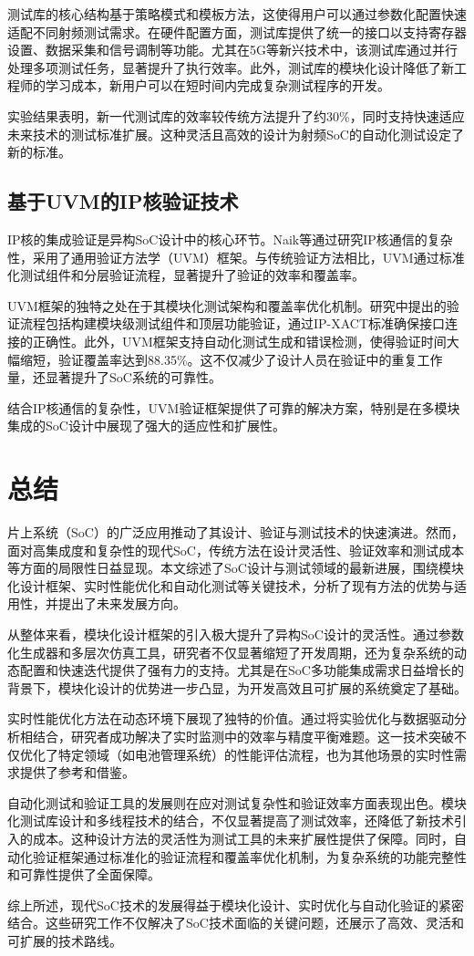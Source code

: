 \documentclass[12pt,hyperref,a4paper,UTF8]{ctexart}
\begin{document}
测试库的核心结构基于策略模式和模板方法，这使得用户可以通过参数化配置快速适配不同射频测试需求。在硬件配置方面，测试库提供了统一的接口以支持寄存器设置、数据采集和信号调制等功能。尤其在5G等新兴技术中，该测试库通过并行处理多项测试任务，显著提升了执行效率。此外，测试库的模块化设计降低了新工程师的学习成本，新用户可以在短时间内完成复杂测试程序的开发。

实验结果表明，新一代测试库的效率较传统方法提升了约30\%，同时支持快速适应未来技术的测试标准扩展。这种灵活且高效的设计为射频SoC的自动化测试设定了新的标准。

\subsection{基于UVM的IP核验证技术}
IP核的集成验证是异构SoC设计中的核心环节。Naik等通过研究IP核通信的复杂性，采用了通用验证方法学（UVM）框架\cite{9641547}。与传统验证方法相比，UVM通过标准化测试组件和分层验证流程，显著提升了验证的效率和覆盖率。

UVM框架的独特之处在于其模块化测试架构和覆盖率优化机制。研究中提出的验证流程包括构建模块级测试组件和顶层功能验证，通过IP-XACT标准确保接口连接的正确性。此外，UVM框架支持自动化测试生成和错误检测，使得验证时间大幅缩短，验证覆盖率达到88.35\%。这不仅减少了设计人员在验证中的重复工作量，还显著提升了SoC系统的可靠性。

结合IP核通信的复杂性，UVM验证框架提供了可靠的解决方案，特别是在多模块集成的SoC设计中展现了强大的适应性和扩展性。

\section{总结}

片上系统（SoC）的广泛应用推动了其设计、验证与测试技术的快速演进。然而，面对高集成度和复杂性的现代SoC，传统方法在设计灵活性、验证效率和测试成本等方面的局限性日益显现。本文综述了SoC设计与测试领域的最新进展，围绕模块化设计框架、实时性能优化和自动化测试等关键技术，分析了现有方法的优势与适用性，并提出了未来发展方向。

从整体来看，模块化设计框架的引入极大提升了异构SoC设计的灵活性。通过参数化生成器和多层次仿真工具，研究者不仅显著缩短了开发周期，还为复杂系统的动态配置和快速迭代提供了强有力的支持。尤其是在SoC多功能集成需求日益增长的背景下，模块化设计的优势进一步凸显，为开发高效且可扩展的系统奠定了基础。

实时性能优化方法在动态环境下展现了独特的价值。通过将实验优化与数据驱动分析相结合，研究者成功解决了实时监测中的效率与精度平衡难题。这一技术突破不仅优化了特定领域（如电池管理系统）的性能评估流程，也为其他场景的实时性需求提供了参考和借鉴。

自动化测试和验证工具的发展则在应对测试复杂性和验证效率方面表现出色。模块化测试库设计和多线程技术的结合，不仅显著提高了测试效率，还降低了新技术引入的成本。这种设计方法的灵活性为测试工具的未来扩展性提供了保障。同时，自动化验证框架通过标准化的验证流程和覆盖率优化机制，为复杂系统的功能完整性和可靠性提供了全面保障。

综上所述，现代SoC技术的发展得益于模块化设计、实时优化与自动化验证的紧密结合。这些研究工作不仅解决了SoC技术面临的关键问题，还展示了高效、灵活和可扩展的技术路线。


\end{document}
